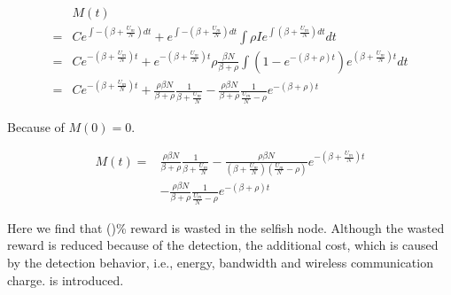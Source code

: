 \begin{small}
\begin{equation}
\nonumber
\begin{aligned}
& M(t) \\
=& C e^{\int -(\beta + \frac{U_{m}}{N}) dt} + e^{\int -(\beta + \frac{U_{m}}{N}) dt} \int \rho I e^{\int (\beta + \frac{U_{m}}{N}) dt} dt \\
=& C e^{-(\beta + \frac{U_{m}}{N})t} + e^{-(\beta + \frac{U_{m}}{N})t} \rho \frac{ \beta N }{ \beta + \rho }  \int ( 1 - e^{-(\beta + \rho)t} ) e^{(\beta + \frac{U_{m}}{N})t} dt \\
=& C e^{-(\beta + \frac{U_{m}}{N})t} + \frac{ \rho \beta N }{ \beta + \rho } \frac{1}{\beta + \frac{U_{m}}{N}}
- \frac{ \rho \beta N }{ \beta + \rho } \frac{1}{\frac{U_{m}}{N} - \rho} e^{-(\beta + \rho)t}
\end{aligned}
\end{equation}
\end{small}
Because of $M(0) = 0$.
\begin{small}
\begin{equation}
\nonumber
\begin{aligned}
M(t) =& \frac{ \rho \beta N }{ \beta + \rho } \frac{1}{\beta + \frac{U_{m}}{N}}
- \frac{\rho \beta N}{(\beta + \frac{U_{m}}{N})(\frac{U_{m}}{N} - \rho)}  e^{-(\beta + \frac{U_{m}}{N})t}\\
& - \frac{ \rho \beta N }{ \beta + \rho } \frac{1}{\frac{U_{m}}{N} - \rho} e^{-(\beta + \rho)t}
\end{aligned}
\end{equation}
\end{small}

Here we find that ()\% reward is wasted in the selfish node.
Although the wasted reward is reduced because of the detection,
the additional cost,
which is caused by the detection behavior,
i.e., energy, bandwidth and wireless communication charge.
is introduced.
